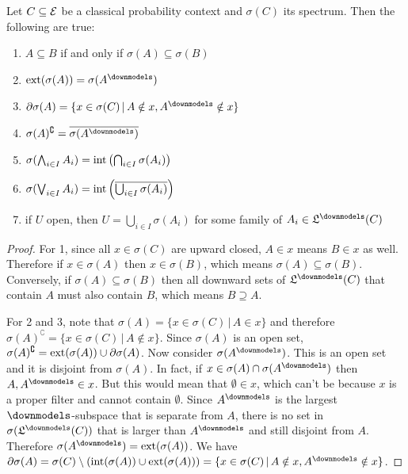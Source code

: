 \begin{mathSection}
\begin{prop}
	Let $C \subseteq \mathcal{E}$ be a classical probability context and $\sigma(C)$ its spectrum. Then the following are true:
	\begin{enumerate}
		\item $A \subseteq B$ if and only if $\sigma(A) \subseteq \sigma(B)$
		\item $\exterior(\sigma(A)) = \sigma(A^{\separate})$
		\item $\partial \sigma(A) = \{ x \in \sigma(C) \, | \, A \notin x, A^{\separate} \notin x \}$
		\item $\sigma(A)^{\complement} = \overline{\sigma(A^{\separate})}$
		\item $\sigma(\bigwedge_{i \in I} A_i) = \operatorname{int}\left(\bigcap_{i \in I} \sigma(A_i)\right)$
		\item $\sigma(\bigvee_{i \in I} A_i) = \operatorname{int}\left(\overline{\bigcup_{i \in I} \sigma(A_i)}\right)$
		\item if $U$ open, then $U = \bigcup_{i \in I} \sigma(A_i)$ for some family of $A_i \in \mathfrak{L}^\separate(C)$
	\end{enumerate}
\end{prop}

\begin{proof}
	For 1, since all $x \in \sigma(C)$ are upward closed, $A \in x$ means $B \in x$ as well. Therefore if $x \in \sigma(A)$ then $x \in \sigma(B)$, which means $\sigma(A) \subseteq \sigma(B)$. Conversely, if $\sigma(A) \subseteq \sigma(B)$ then all downward sets of $\mathfrak{L}^\separate(C)$ that contain $A$ must also contain $B$, which means $B \supseteq A$.
	
	For 2 and 3, note that $\sigma(A) = \{ x \in \sigma(C) \, | \, A \in x \}$ and therefore $\sigma(A)^{\complement} = \{ x \in \sigma(C) \, | \, A \notin x \}$. Since $\sigma(A)$ is an open set, $\sigma(A)^{\complement} = \operatorname{ext}(\sigma(A)) \cup \partial \sigma(A)$. Now consider $\sigma(A^{\separate})$. This is an open set and it is disjoint from $\sigma(A)$. In fact, if $x \in \sigma(A) \cap \sigma(A^{\separate})$ then $A, A^{\separate} \in x$. But this would mean that $\emptyset \in x$, which can't be because $x$ is a proper filter and cannot contain $\emptyset$. Since $A^{\separate}$ is the largest $\separate$-subspace that is separate from $A$, there is no set in $\sigma(\mathfrak{L}^\separate(C))$ that is larger than $A^{\separate}$ and still disjoint from $A$. Therefore $\sigma(A^{\separate}) = \exterior(\sigma(A))$. We have $\partial \sigma(A) = \sigma(C) \setminus (\interior(\sigma(A))\cup\exterior(\sigma(A))) = \{ x \in \sigma(C) \, | \, A \notin x, A^{\separate} \notin x \}$.
	

\end{proof}
\end{mathSection}
